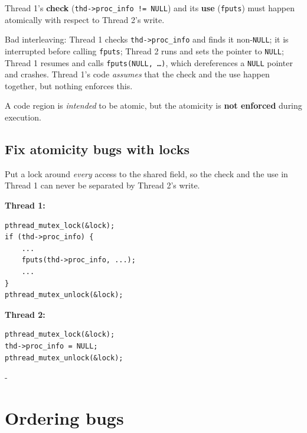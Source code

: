 \documentclass[11pt,a4paper]{article}
\makeatletter
\newcommand{\keepspace}[1]{\par\penalty-100\begingroup
  \setlength{\dimen@}{#1}\dimen@ii\pagegoal\advance\dimen@ii-\pagetotal
  \ifdim\dimen@>\dimen@ii\ifdim\dimen@ii>\z@\vfil\fi\break\fi\endgroup}
\makeatother
\begin{document}
\begin{quizbox}
Thread 1's \textbf{check} (\texttt{thd->proc\_info != NULL}) and its
\textbf{use} (\texttt{fputs}) must happen atomically with respect to
Thread 2's write.

Bad interleaving: Thread 1 checks \texttt{thd->proc\_info} and finds it
non-\texttt{NULL}; it is interrupted before calling \texttt{fputs}; Thread 2
runs and sets the pointer to \texttt{NULL}; Thread 1 resumes and calls
\texttt{fputs(NULL, \ldots)}, which dereferences a \texttt{NULL} pointer and
crashes. Thread 1's code \emph{assumes} that the check and the use happen
together, but nothing enforces this.
\end{quizbox}

\begin{defbox}
A code region is \emph{intended} to be atomic, but the atomicity is
\textbf{not enforced} during execution.
\end{defbox}

\subsection{Fix atomicity bugs with locks}

Put a lock around \emph{every} access to the shared field, so the check and
the use in Thread 1 can never be separated by Thread 2's write.

\begin{center}
\begin{minipage}[t]{0.5\textwidth}
\textbf{Thread 1:}
\begin{lstlisting}[numbers=none]
pthread_mutex_lock(&lock);
if (thd->proc_info) {
    ...
    fputs(thd->proc_info, ...);
    ...
}
pthread_mutex_unlock(&lock);
\end{lstlisting}
\end{minipage}\hfill
\begin{minipage}[t]{0.44\textwidth}
\textbf{Thread 2:}
\begin{lstlisting}[numbers=none]
pthread_mutex_lock(&lock);
thd->proc_info = NULL;
pthread_mutex_unlock(&lock);
\end{lstlisting}
\end{minipage}
\end{center}

\keepspace{14\baselineskip}
\section{Ordering bugs}\label{sec:order}
\end{document}
